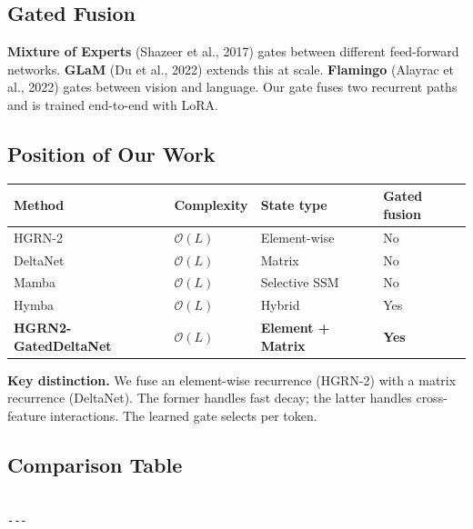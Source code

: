 \subsection{Gated Fusion}

\textbf{Mixture of Experts} (Shazeer et al., 2017) gates between different 
feed-forward networks. \textbf{GLaM} (Du et al., 2022) extends this at scale. 
\textbf{Flamingo} (Alayrac et al., 2022) gates between vision and language. 
Our gate fuses two recurrent paths and is trained end-to-end with LoRA.

\subsection{Position of Our Work}

\begin{table}[H]
\centering
\small
\begin{tabular}{llll}
\toprule
\textbf{Method} & \textbf{Complexity} & \textbf{State type} & \textbf{Gated fusion} \\
\midrule
HGRN-2 & $\mathcal{O}(L)$ & Element-wise & No \\
DeltaNet & $\mathcal{O}(L)$ & Matrix & No \\
Mamba & $\mathcal{O}(L)$ & Selective SSM & No \\
Hymba & $\mathcal{O}(L)$ & Hybrid & Yes \\
\textbf{HGRN2-GatedDeltaNet} & $\mathcal{O}(L)$ & \textbf{Element + Matrix} & \textbf{Yes} \\
\bottomrule
\end{tabular}
\end{table}

\textbf{Key distinction.} We fuse an element-wise recurrence (HGRN-2) with a 
matrix recurrence (DeltaNet). The former handles fast decay; the latter 
handles cross-feature interactions. The learned gate selects per token.



\subsection{Comparison Table}

\begin{lstlisting}

---
\end{lstlisting}